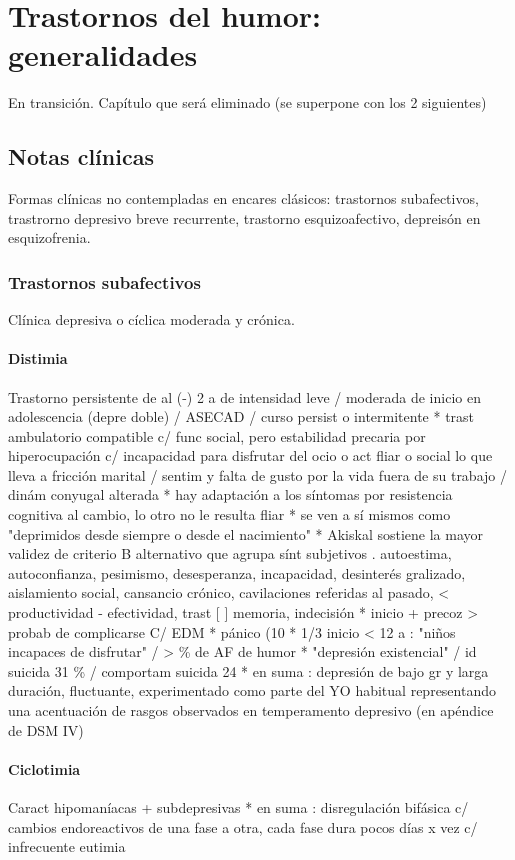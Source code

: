 \chapter{Trastornos del humor: generalidades}
\faStopCircle En transición. Capítulo que será eliminado (se superpone con los 2 siguientes)
\section*{Notas clínicas}
Formas clínicas no contempladas en encares clásicos: trastornos subafectivos, trastrorno depresivo breve recurrente, trastorno esquizoafectivo, depreisón en esquizofrenia.
\subsection*{Trastornos subafectivos}
Clínica depresiva o cíclica moderada y crónica.
\subsubsection*{Distimia}
Trastorno persistente de al (-) 2 a de intensidad leve / moderada de inicio en adolescencia (depre doble) / ASECAD / curso persist o intermitente
* trast ambulatorio compatible c/ func social, pero estabilidad precaria por hiperocupación c/ incapacidad para disfrutar del ocio o act fliar o social lo que lleva a fricción marital / sentim y falta de gusto por la vida fuera de su trabajo / dinám conyugal alterada
* hay adaptación a los síntomas por resistencia cognitiva al cambio, lo otro no le resulta fliar
* se ven a sí mismos como "deprimidos desde siempre o desde el nacimiento"
* Akiskal sostiene la mayor validez de criterio B alternativo que agrupa sínt subjetivos . autoestima, autoconfianza, pesimismo, desesperanza, incapacidad, desinterés gralizado, aislamiento social, cansancio crónico, cavilaciones referidas al pasado, < productividad - efectividad, trast [ ] memoria, indecisión
* inicio + precoz > probab de complicarse C/ EDM
* pánico (10 %
* 1/3 inicio < 12 a : "niños incapaces de disfrutar" / > \% de AF de humor
* "depresión existencial" / id suicida 31 \% / comportam suicida 24 %
* en suma : depresión de bajo gr y larga duración, fluctuante, experimentado como parte del YO habitual representando una acentuación de rasgos observados en temperamento depresivo (en apéndice de DSM IV)
\subsubsection*{Ciclotimia}
Caract hipomaníacas + subdepresivas
* en suma : disregulación bifásica c/ cambios endoreactivos de una fase a otra, cada fase dura pocos días x vez c/ infrecuente eutimia

